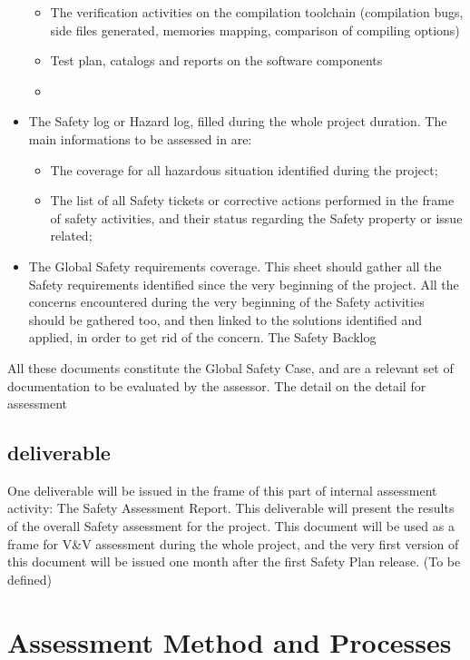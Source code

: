 \documentclass{template/openetcs_article}
\begin{document}
\begin{itemize}
\begin{itemize}
	\item The verification activities on the compilation toolchain (compilation bugs, side files generated, memories mapping, comparison of compiling options)
	\item Test plan, catalogs and reports on the software components
	\item	
	\end{itemize}
\item The Safety log or Hazard log, filled during the whole project duration. The main informations to be assessed in are:
	\begin{itemize}
	\item The coverage for all hazardous situation identified during the project;
	\item The list of all Safety tickets or corrective actions performed in the frame of safety activities, and their status regarding the Safety property or issue related;
	\end{itemize}
\item The Global Safety requirements coverage. This sheet should gather all the Safety requirements identified since the very beginning of the project. All the concerns encountered during the very beginning of the Safety activities should be gathered too, and then linked to the solutions identified and applied, in order to get rid of the concern. The Safety Backlog
\end{itemize}

All these documents constitute the Global Safety Case, and are a relevant set of documentation to be evaluated by the assessor.
The detail on the detail for assessment

\subsection{deliverable}
One deliverable will be issued in the frame of this part of internal assessment activity: The Safety Assessment Report. This deliverable will present the results of the overall Safety assessment for the project.
This document will be used as a frame for V\&V assessment during the whole project, and the very first version of this document will be issued one month after the first Safety Plan release. (To be defined)


\section{Assessment Method and Processes}
\end{document}
